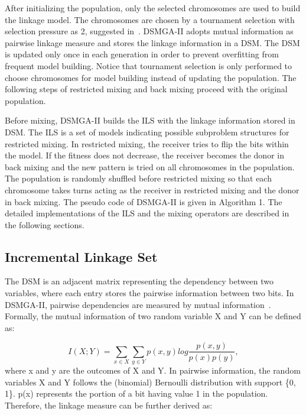 \documentclass{sig-alternate-05-2015}
\begin{document}
After initializing the population, only the selected chromosomes are used to build the linkage model. The chromosomes are chosen by a tournament selection with selection pressure as 2, suggested in~\cite{yu:population}. DSMGA-II adopts mutual information as pairwise linkage measure and stores the linkage information in a DSM. The DSM is updated only once in each generation in order to prevent overfitting from frequent model building. Notice that tournament selection is only performed to choose chromosomes for model building instead of updating the population. The following steps of restricted mixing and back mixing proceed with the original population.


Before mixing, DSMGA-II builds the ILS with the linkage information stored in DSM. The ILS is a set of models indicating possible subproblem structures for restricted mixing. In restricted mixing, the receiver tries to flip the bits within the model. If the fitness does not decrease, the receiver becomes the donor in back mixing and the new pattern is tried on all chromosomes in the population. The population is randomly shuffled before restricted mixing so that each chromosome takes turns acting as the receiver in restricted mixing and the donor in back mixing. The pseudo code of DSMGA-II is given in Algorithm 1. The detailed implementations of the ILS and the mixing operators are described in the following sections. 



\subsection{Incremental Linkage Set}
The DSM is an adjacent matrix representing the dependency between two variables, where each entry stores the pairwise information between two bits. In DSMGA-II, pairwise dependencies are measured by mutual information~\cite{kullback:KL-diversion}. Formally, the mutual information of two random variable X and Y can be defined as:

\begin{displaymath} 
I(X;Y) = \sum_{x \in X}\sum_{y \in Y} p(x,y)  log \frac{p(x,y)}{p(x) p(y)}, 
\end{displaymath}
where x and y are the outcomes of X and Y. In pairwise information, the random variables X and Y follows the (binomial) Bernoulli distribution with support \{0, 1\}. p(x) represents the portion of a bit having value 1 in the population. Therefore, the linkage measure can be further derived as:
\end{document}
